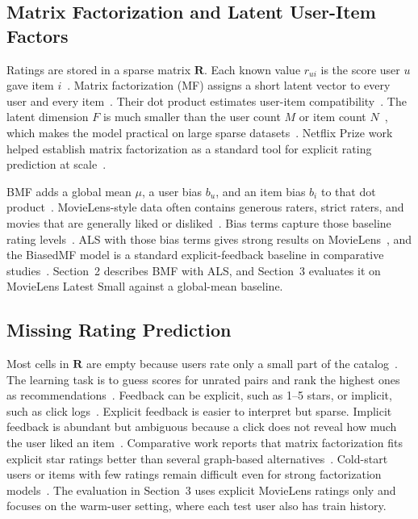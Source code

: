 \documentclass[conference]{IEEEtran}
\begin{document}
\subsection{Matrix Factorization and Latent User-Item Factors}

Ratings are stored in a sparse matrix $\mathbf{R}$. Each known value $r_{ui}$ is the score user $u$ gave item $i$~\cite{ref3}. Matrix factorization (MF) assigns a short latent vector to every user and every item~\cite{ref3,ref6}. Their dot product estimates user-item compatibility~\cite{ref3,ref6}. The latent dimension $F$ is much smaller than the user count $M$ or item count $N$~\cite{ref3}, which makes the model practical on large sparse datasets~\cite{ref2,ref1}. Netflix Prize work helped establish matrix factorization as a standard tool for explicit rating prediction at scale~\cite{ref4}.

BMF adds a global mean $\mu$, a user bias $b_u$, and an item bias $b_i$ to that dot product~\cite{ref2,ref3}. MovieLens-style data often contains generous raters, strict raters, and movies that are generally liked or disliked~\cite{ref2}. Bias terms capture those baseline rating levels~\cite{ref2,ref3}. ALS with those bias terms gives strong results on MovieLens~\cite{ref1}, and the BiasedMF model is a standard explicit-feedback baseline in comparative studies~\cite{ref2}. Section~2 describes BMF with ALS, and Section~3 evaluates it on MovieLens Latest Small against a global-mean baseline.

\subsection{Missing Rating Prediction}

Most cells in $\mathbf{R}$ are empty because users rate only a small part of the catalog~\cite{ref3}. The learning task is to guess scores for unrated pairs and rank the highest ones as recommendations~\cite{ref3,ref4}. Feedback can be explicit, such as 1--5 stars, or implicit, such as click logs~\cite{ref3,ref4}. Explicit feedback is easier to interpret but sparse. Implicit feedback is abundant but ambiguous because a click does not reveal how much the user liked an item~\cite{ref4}. Comparative work reports that matrix factorization fits explicit star ratings better than several graph-based alternatives~\cite{ref10}. Cold-start users or items with few ratings remain difficult even for strong factorization models~\cite{ref10}. The evaluation in Section~3 uses explicit MovieLens ratings only and focuses on the warm-user setting, where each test user also has train history.
\end{document}

